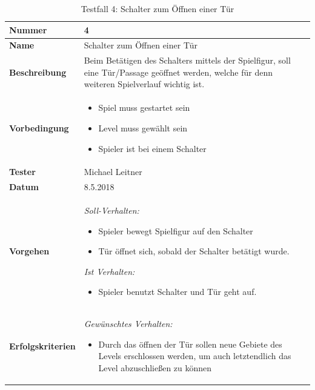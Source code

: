 \begin{table}

	\renewcommand{\arraystretch}{1.5}
	\begin{tabular}{|p{3.5cm}|p{11cm}|}
		
		\hline 
		\textbf{Nummer} & 4 \\ 
		\hline 
		\textbf{Name} & {\large Schalter zum Öffnen einer Tür} \\ 
		\hline 
		\textbf{Beschreibung} & 
		Beim Betätigen des Schalters mittels der Spielfigur, soll eine Tür/Passage geöffnet werden, welche für denn weiteren Spielverlauf wichtig ist. \\ 
		\hline 
		\textbf{Vorbedingung} & 
		\begin{itemize}
			\setlength{\itemsep}{1pt}
			\setlength{\parskip}{0.5pt}
			\item Spiel muss gestartet sein
			\item Level muss gewählt sein
			\item Spieler ist bei einem Schalter
		\end{itemize} \\ 
		\hline 
		\textbf{Tester} & Michael Leitner \\ 
		\hline 
		\textbf{Datum} & 8.5.2018 \\ 
		\hline 
		\textbf{Vorgehen} & 
		\textit{Soll-Verhalten:}
		\begin{itemize}
			\setlength{\itemsep}{1pt}
			\setlength{\parskip}{0.5pt}
			\item Spieler bewegt Spielfigur auf den Schalter
			\item Tür öffnet sich, sobald der Schalter betätigt wurde.\newline
		\end{itemize}  
		
		
		\textit{Ist Verhalten:}
		\begin{itemize}
			\setlength{\itemsep}{1pt}
			\setlength{\parskip}{0.5pt}
			\item Spieler benutzt Schalter und Tür geht auf. 
		\end{itemize}\\ 
		\hline 
		\textbf{Erfolgskriterien} & 
		\textit{Gewünschtes Verhalten:}
		\begin{itemize}
			\setlength{\itemsep}{1pt}
			\setlength{\parskip}{0.5pt}
			\item Durch das öffnen der Tür sollen neue Gebiete des Levels erschlossen werden, um auch letztendlich das Level abzuschließen zu können
		\end{itemize} \\ 
		\hline 
	\end{tabular} 
	\caption{Testfall 4: Schalter zum Öffnen einer Tür}
\end{table}

